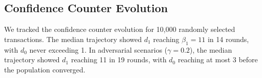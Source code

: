 \subsection{Confidence Counter Evolution}

We tracked the confidence counter evolution for 10,000 randomly selected transactions.
The median trajectory showed $d_1$ reaching $\beta_1 = 11$ in 14 rounds, with $d_0$
never exceeding 1. In adversarial scenarios ($\gamma = 0.2$), the median trajectory
showed $d_1$ reaching 11 in 19 rounds, with $d_0$ reaching at most 3 before the population
converged.

